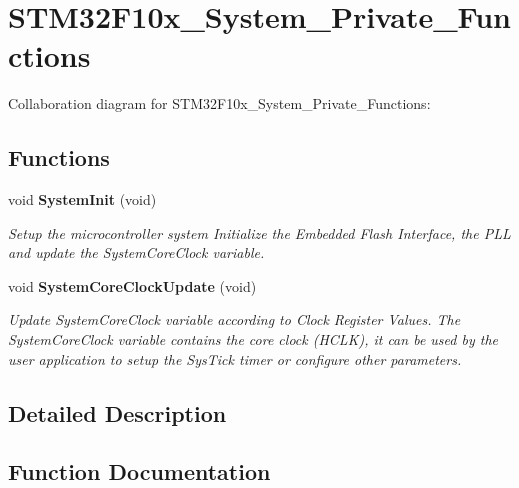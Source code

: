 \section{S\+T\+M32\+F10x\+\_\+\+System\+\_\+\+Private\+\_\+\+Functions}
\label{group___s_t_m32_f10x___system___private___functions}
Collaboration diagram for S\+T\+M32\+F10x\+\_\+\+System\+\_\+\+Private\+\_\+\+Functions\+:
\subsection*{Functions}
\begin{DoxyCompactItemize}
\item 
void \textbf{ System\+Init} (void)
\begin{DoxyCompactList}\small\item\em Setup the microcontroller system Initialize the Embedded Flash Interface, the P\+LL and update the System\+Core\+Clock variable. \end{DoxyCompactList}\item 
void \textbf{ System\+Core\+Clock\+Update} (void)
\begin{DoxyCompactList}\small\item\em Update System\+Core\+Clock variable according to Clock Register Values. The System\+Core\+Clock variable contains the core clock (H\+C\+LK), it can be used by the user application to setup the Sys\+Tick timer or configure other parameters. \end{DoxyCompactList}\end{DoxyCompactItemize}


\subsection{Detailed Description}


\subsection{Function Documentation}
\mbox{\label{group___s_t_m32_f10x___system___private___functions_gae0c36a9591fe6e9c45ecb21a794f0f0f}} 
